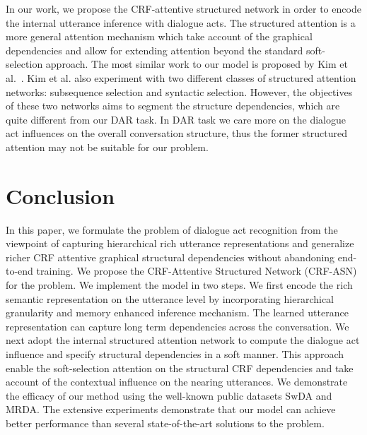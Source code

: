 \documentclass[sigconf]{acmart}
\begin{document}
In our work, we propose the CRF-attentive structured network in order to encode the internal utterance inference with dialogue acts. The structured attention is a more general attention mechanism which take account of the graphical dependencies and allow for extending attention beyond the standard soft-selection approach. The most similar work to our model is proposed by Kim et al.~\cite{kimstructured}. Kim et al. also experiment with two different classes of structured attention networks: subsequence selection and syntactic selection. However, the objectives of these two networks aims to segment the structure dependencies, which are quite different from our DAR task. In DAR task we care more on the dialogue act influences on the overall conversation structure, thus the former structured attention may not be suitable for our problem.

\section{Conclusion}
In this paper, we formulate the problem of dialogue act recognition from the viewpoint of capturing hierarchical rich utterance representations and generalize richer CRF attentive graphical structural dependencies without abandoning end-to-end training. We propose the CRF-Attentive Structured Network (CRF-ASN) for the problem. We implement the model in two steps. We first encode the rich semantic representation on the utterance level by incorporating hierarchical granularity and memory enhanced inference mechanism. The learned utterance representation can capture long term dependencies across the conversation. We next adopt the internal structured attention network to compute the dialogue act influence and specify structural dependencies in a soft manner. This approach enable the soft-selection attention on the structural CRF dependencies and take account of the contextual influence on the nearing utterances. We demonstrate the efficacy of our method using the well-known public datasets SwDA and MRDA. The extensive experiments demonstrate that our model can achieve better performance than several state-of-the-art solutions to the problem.   

 
\end{document}
